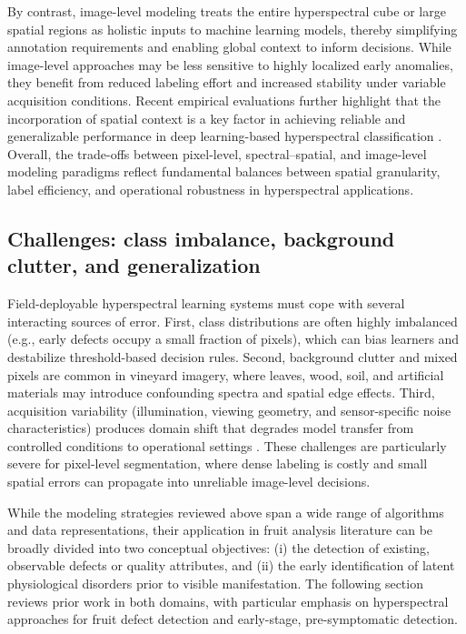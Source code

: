 \medskip
\noindent
By contrast, image-level modeling treats the entire hyperspectral cube or large spatial regions as holistic inputs to machine learning models, thereby simplifying annotation requirements and enabling global context to inform decisions. While image-level approaches may be less sensitive to highly localized early anomalies, they benefit from reduced labeling effort and increased stability under variable acquisition conditions. Recent empirical evaluations further highlight that the incorporation of spatial context is a key factor in achieving reliable and generalizable performance in deep learning-based hyperspectral classification \cite{Chen2024MutationHSI}. Overall, the trade-offs between pixel-level, spectral--spatial, and image-level modeling paradigms reflect fundamental balances between spatial granularity, label efficiency, and operational robustness in hyperspectral applications.




\subsection{Challenges: class imbalance, background clutter, and generalization}

\noindent
Field-deployable hyperspectral learning systems must cope with several interacting sources of error. First, class distributions are often highly imbalanced (e.g., early defects occupy a small fraction of pixels), which can bias learners and destabilize threshold-based decision rules. Second, background clutter and mixed pixels are common in vineyard imagery, where leaves, wood, soil, and artificial materials may introduce confounding spectra and spatial edge effects. Third, acquisition variability (illumination, viewing geometry, and sensor-specific noise characteristics) produces domain shift that degrades model transfer from controlled conditions to operational settings \cite{RAM2024109037, su16146064}. These challenges are particularly severe for pixel-level segmentation, where dense labeling is costly and small spatial errors can propagate into unreliable image-level decisions.

\medskip
\noindent
While the modeling strategies reviewed above span a wide range of algorithms and data representations, their application in fruit analysis literature can be broadly divided into two conceptual objectives: (i) the detection of existing, observable defects or quality attributes, and (ii) the early identification of latent physiological disorders prior to visible manifestation. The following section reviews prior work in both domains, with particular emphasis on hyperspectral approaches for fruit defect detection and early-stage, pre-symptomatic detection.

